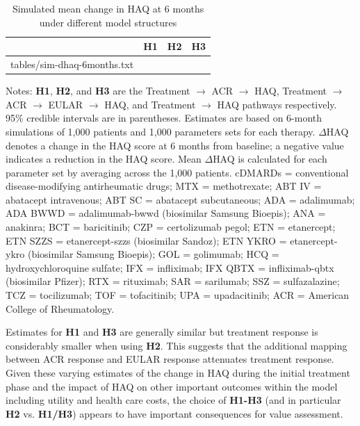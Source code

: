 \documentclass[11pt,final,fleqn]{article}
\makeatletter
\theoremstyle{plain}
\newcommand*\ExpandableInput[1]{\@@input#1 }
\makeatother
\begin{document}
\begin{table}[!ht]
\begin{center}
\begin{threeparttable}
\caption{Simulated mean change in HAQ at 6 months under different model structures} \label{tbl:sim-haq-change}
\begin{tabularx}{\textwidth}{@{\extracolsep{\fill}}lccc}
\hline
\multicolumn{1}{l}{} & \multicolumn{1}{c}{\textbf{H1}} & \multicolumn{1}{c}{\textbf{H2}} & \multicolumn{1}{c}{\textbf{H3}} \\
\hline
\ExpandableInput{tables/sim-dhaq-6months.txt}
\hline
\end{tabularx}
\scriptsize
Notes: \textbf{H1}, \textbf{H2}, and \textbf{H3} are the Treatment $\rightarrow$ ACR $\rightarrow$ HAQ, Treatment $\rightarrow$ ACR $\rightarrow$ EULAR $\rightarrow$ HAQ, and Treatment $\rightarrow$ HAQ pathways respectively. 95\% credible intervals are in parentheses. Estimates are based on 6-month simulations of 1,000 patients and 1,000 parameters sets for each therapy. $\Delta$HAQ denotes a change in the HAQ score at 6 months from baseline; a negative value indicates a reduction in the HAQ score. Mean $\Delta$HAQ is calculated for each parameter set by averaging across the 1,000 patients. cDMARDs = conventional disease-modifying antirheumatic drugs; MTX = methotrexate; ABT IV = abatacept intravenous; ABT SC = abatacept subcutaneous; ADA = adalimumab; ADA BWWD = adalimumab-bwwd (biosimilar Samsung Bioepis); ANA = anakinra; BCT = baricitinib; CZP = certolizumab pegol; ETN = etanercept; ETN SZZS = etanercept-szzs (biosimilar Sandoz); ETN YKRO = etanercept-ykro (biosimilar Samsung Bioepis); GOL = golimumab; HCQ = hydroxychloroquine sulfate; IFX = infliximab; IFX QBTX = infliximab-qbtx (biosimilar Pfizer); RTX = rituximab; SAR = sarilumab; SSZ = sulfazalazine; TCZ = tocilizumab; TOF = tofacitinib; UPA = upadacitinib;  ACR = American College of Rheumatology. 
\end{threeparttable}
\end{center}
\end{table}

Estimates for \textbf{H1} and \textbf{H3} are generally similar but treatment response is considerably smaller when using \textbf{H2}. This suggests that the additional mapping between ACR response and EULAR response attenuates treatment response. Given these varying estimates of the change in HAQ during the initial treatment phase and the impact of HAQ on other important outcomes within the model including utility and health care costs, the choice of \textbf{H1-H3} (and in particular \textbf{H2} vs. \textbf{H1/H3}) appears to have important consequences for value assessment.  
\end{document}

